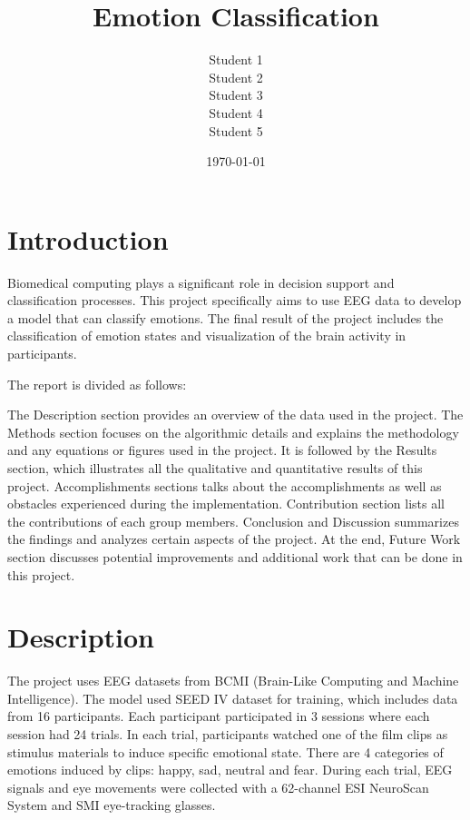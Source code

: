 \documentclass[12pt, a4paper]{report}
\title{Emotion Classification}
\author{Student 1 \\ Student 2 \\ Student 3 \\ Student 4 \\ Student 5}
\date{\today}
\begin{document}
\maketitle
\tableofcontents
\newpage


\section{Introduction}
Biomedical computing plays a significant role in decision support and classification processes. This project specifically aims to use EEG data to develop a model that can classify emotions. The final result of the project includes the classification of emotion states and visualization of the brain activity in participants. 

The report is divided as follows:

The Description section provides an overview of the data used in the project. The Methods section focuses on the algorithmic details and explains the methodology and any equations or figures used in the project. It is followed by the Results section, which illustrates all the qualitative and quantitative results of this project. Accomplishments sections talks about the accomplishments as well as obstacles experienced during the implementation. Contribution section lists all the contributions of each group members. Conclusion and Discussion summarizes the findings and analyzes certain aspects of the project. At the end, Future Work section discusses potential improvements and additional work that can be done in this project.


\section{Description}
The project uses EEG datasets from BCMI (Brain-Like Computing and Machine Intelligence). The model used SEED IV dataset for training, which includes data from 16 participants. Each participant participated in 3 sessions where each session had 24 trials. In each trial, participants watched one of the film clips as stimulus materials to induce specific emotional state. There are 4 categories of emotions induced by clips: happy, sad, neutral and fear. During each trial, EEG signals and eye movements were collected with a 62-channel ESI NeuroScan System and SMI eye-tracking glasses. 
\end{document}
